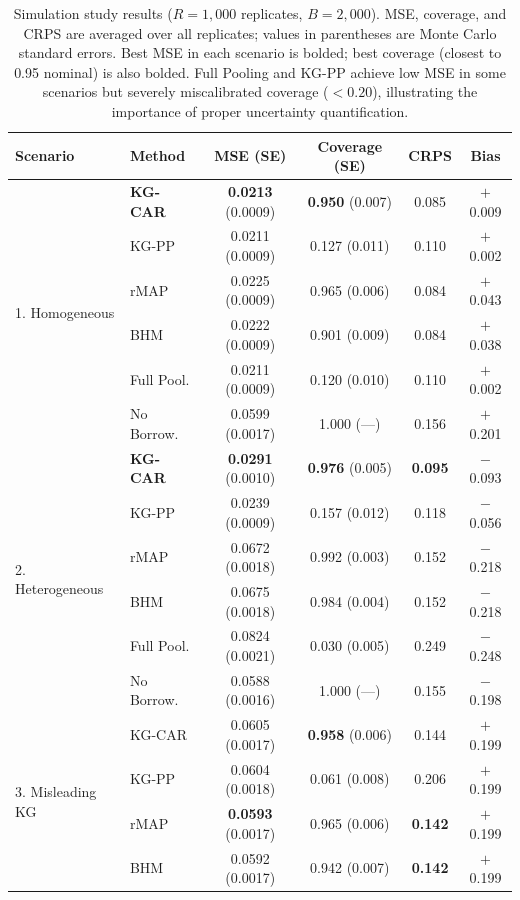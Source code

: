\documentclass[12pt]{article}
\begin{document}
\begin{table}[ht]
\centering
\caption{Simulation study results ($R = 1{,}000$ replicates, $B = 2{,}000$). MSE, coverage, and CRPS are averaged over all replicates; values in parentheses are Monte Carlo standard errors. Best MSE in each scenario is bolded; best coverage (closest to 0.95 nominal) is also bolded. Full Pooling and KG-PP achieve low MSE in some scenarios but severely miscalibrated coverage ($< 0.20$), illustrating the importance of proper uncertainty quantification.}
\label{tab:simulation}
\small
\begin{tabular}{llcccc}
\toprule
Scenario & Method & MSE (SE) & Coverage (SE) & CRPS & Bias \\
\midrule
\multirow{6}{*}{1. Homogeneous}
& \textbf{KG-CAR} & \textbf{0.0213} (0.0009) & \textbf{0.950} (0.007) & 0.085 & $+$0.009 \\
& KG-PP & 0.0211 (0.0009) & 0.127 (0.011) & 0.110 & $+$0.002 \\
& rMAP & 0.0225 (0.0009) & 0.965 (0.006) & 0.084 & $+$0.043 \\
& BHM & 0.0222 (0.0009) & 0.901 (0.009) & 0.084 & $+$0.038 \\
& Full Pool. & 0.0211 (0.0009) & 0.120 (0.010) & 0.110 & $+$0.002 \\
& No Borrow. & 0.0599 (0.0017) & 1.000 (---) & 0.156 & $+$0.201 \\
\midrule
\multirow{6}{*}{2. Heterogeneous}
& \textbf{KG-CAR} & \textbf{0.0291} (0.0010) & \textbf{0.976} (0.005) & \textbf{0.095} & $-$0.093 \\
& KG-PP & 0.0239 (0.0009) & 0.157 (0.012) & 0.118 & $-$0.056 \\
& rMAP & 0.0672 (0.0018) & 0.992 (0.003) & 0.152 & $-$0.218 \\
& BHM & 0.0675 (0.0018) & 0.984 (0.004) & 0.152 & $-$0.218 \\
& Full Pool. & 0.0824 (0.0021) & 0.030 (0.005) & 0.249 & $-$0.248 \\
& No Borrow. & 0.0588 (0.0016) & 1.000 (---) & 0.155 & $-$0.198 \\
\midrule
\multirow{6}{*}{3. Misleading KG}
& KG-CAR & 0.0605 (0.0017) & \textbf{0.958} (0.006) & 0.144 & $+$0.199 \\
& KG-PP & 0.0604 (0.0018) & 0.061 (0.008) & 0.206 & $+$0.199 \\
& rMAP & \textbf{0.0593} (0.0017) & 0.965 (0.006) & \textbf{0.142} & $+$0.199 \\
& BHM & 0.0592 (0.0017) & 0.942 (0.007) & \textbf{0.142} & $+$0.199 \\

\end{tabular}
\end{table}
\end{document}

